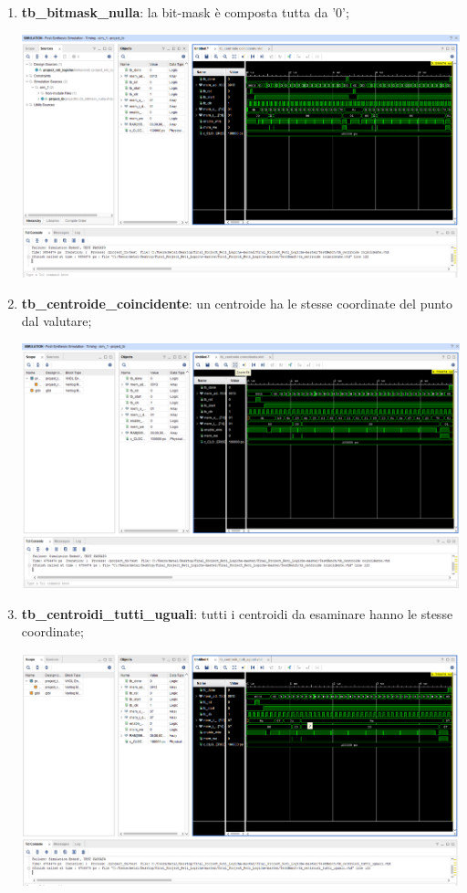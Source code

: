 \documentclass[a4paper,12pt]{article}
\begin{document}
\begin{enumerate}
\item \textbf{tb\_bitmask\_nulla}: la bit-mask è composta tutta da '0';

\includegraphics[scale=0.32]{images/tb_bitmask_nulla}

\item \textbf{tb\_centroide\_coincidente}: un centroide ha le stesse coordinate del punto dal valutare;

\includegraphics[scale=0.32]{images/tb_centroide_coincidente}

\newpage
\item \textbf{tb\_centroidi\_tutti\_uguali}: tutti i centroidi da esaminare hanno le stesse coordinate;

\includegraphics[scale=0.32]{images/tb_centroidi_tutti_uguali}


\end{enumerate}
\end{document}
